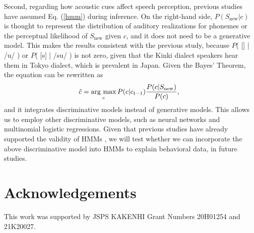 \documentclass[a4paper,11pt,twocolumn]{article}
\newcommand{\argmax}{\mathop{\rm arg~max}\limits}
\begin{document}
Second, regarding how acoustic cues affect speech perception, previous studies \cite{feldman2009influence, wilson2013bayesian, kishiyama2021influence} have assumed Eq. (\ref{hmm}) during inference. On the right-hand side, $P(S_{\text{new}}|c)$ is thought to represent the distribution of auditory realizations for phonemes or the perceptual likelihood of $S_{\text{new}}$ given $c$, and it does not need to be a generative model. This makes the results consistent with the previous study, because $P$( [\textsubring{\textturnm}] | /u/ ) or $P$( [s] | /su/ ) is not zero, given that the Kinki dialect speakers hear them in Tokyo dialect, which is prevalent in Japan. Given the Bayes' Theorem, the equation can be rewritten as
%
\begin{equation} \label{disc}
    \hat{c} = \argmax_{c} P(c | c_{t-1}) \frac{P(c|S_{\text{new}})}{P(c)},
\end{equation}
%
and it integrates discriminative models instead of generative models. This allows us to employ other discriminative models, such as neural networks and multinomial logistic regressions. Given that previous studies have already supported the validity of HMMs \cite{kishiyama2021influence, kishiyama2022onestep}, we will test whether we can incorporate the above discriminative model into HMMs to explain behavioral data, in future studies.

\section{Acknowledgements}

This work was supported by JSPS KAKENHI Grant Numbers 20H01254 and 21K20027.




\end{document}

